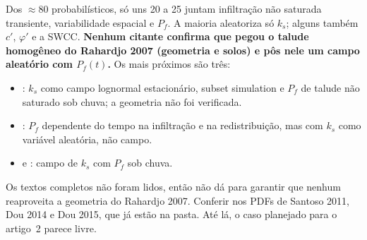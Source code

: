 \documentclass[11pt,a4paper]{article}
\begin{document}
Dos $\approx 80$ probabilísticos, só uns 20 a 25 juntam infiltração não saturada transiente, variabilidade espacial e
$P_f$. A maioria aleatoriza só $k_s$; alguns também $c'$, $\varphi'$ e a SWCC. \textbf{Nenhum citante confirma que pegou
o talude homogêneo do Rahardjo 2007 (geometria e solos) e pôs nele um campo aleatório com $P_f(t)$.} Os mais próximos
são três:
\begin{itemize}
  \item \citet{santoso2011}: $k_s$ como campo lognormal estacionário, subset simulation e $P_f$ de talude não saturado
    sob chuva; a geometria não foi verificada.
  \item \citet{dou2014}: $P_f$ dependente do tempo na infiltração e na redistribuição, mas com $k_s$ como variável
    aleatória, não campo.
  \item \citet{dou2015} e \citet{li2023}: campo de $k_s$ com $P_f$ sob chuva.
\end{itemize}
Os textos completos não foram lidos, então não dá para garantir que nenhum reaproveita a geometria do Rahardjo 2007.
Conferir nos PDFs de Santoso 2011, Dou 2014 e Dou 2015, que já estão na pasta. Até lá, o caso planejado para o
artigo~2 parece livre.
\end{document}
